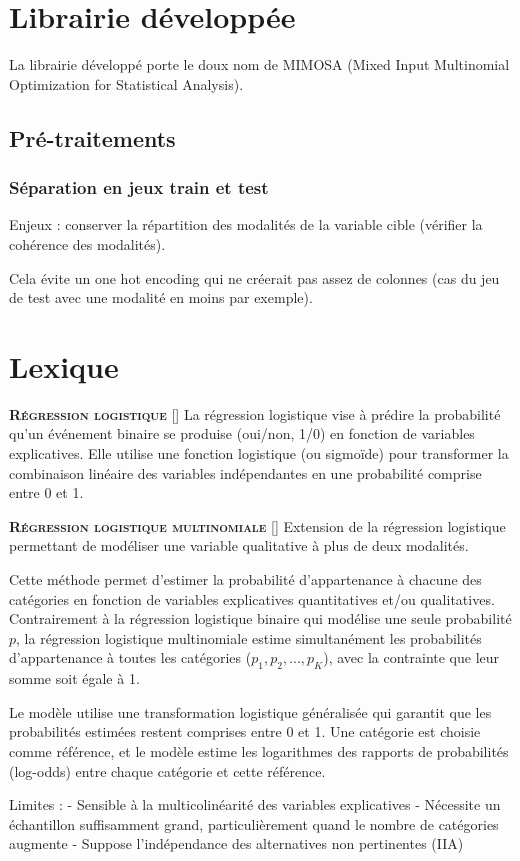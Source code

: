 \documentclass[10pt,french]{report}
\newcommand{\entreelex}[3][]{%
	{\large \textbf{\textsc{#2}}} %
	\if\relax\detokenize{#1}\relax %
	\else %
	\raisebox{0.15ex}{\scalebox{0.7}{$\Diamond$}} %
	[#1] %
	\fi
	\raisebox{0.13ex}{\scalebox{0.75}{$\blacksquare$}} #3 %
}
\begin{document}
	\chapter{Librairie développée}

	La librairie développé porte le doux nom de MIMOSA (Mixed Input Multinomial Optimization for Statistical Analysis).

	\section{Pré-traitements}

	\subsection{Séparation en jeux train et test}

	Enjeux : conserver la répartition des modalités de la variable cible (vérifier la cohérence des modalités).

	Cela évite un one hot encoding qui ne créerait pas assez de colonnes (cas du jeu de test avec une modalité en moins par exemple).

	\chapter{Lexique}

	\entreelex{Régression logistique}{La régression logistique vise à prédire la probabilité qu'un événement binaire se produise (oui/non, 1/0) en fonction de variables explicatives. Elle utilise une fonction logistique (ou sigmoïde) pour transformer la combinaison linéaire des variables indépendantes en une probabilité comprise entre 0 et 1.}

	\entreelex{Régression logistique multinomiale}{Extension de la régression logistique permettant de modéliser une variable qualitative à plus de deux modalités.

	Cette méthode permet d'estimer la probabilité d'appartenance à chacune des catégories en fonction de variables explicatives quantitatives et/ou qualitatives. Contrairement à la régression logistique binaire qui modélise une seule probabilité $p$, la régression logistique multinomiale estime simultanément les probabilités d'appartenance à toutes les catégories ($p_1, p_2, ..., p_K$), avec la contrainte que leur somme soit égale à 1.

	Le modèle utilise une transformation logistique généralisée qui garantit que les probabilités estimées restent comprises entre 0 et 1. Une catégorie est choisie comme référence, et le modèle estime les logarithmes des rapports de probabilités (log-odds) entre chaque catégorie et cette référence.

	Limites :
	- Sensible à la multicolinéarité des variables explicatives
	- Nécessite un échantillon suffisamment grand, particulièrement quand le nombre de catégories augmente
	- Suppose l'indépendance des alternatives non pertinentes (IIA)}
\end{document}
